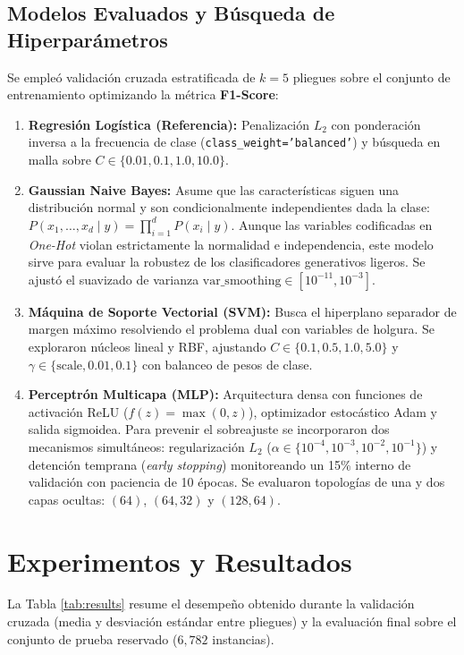 \documentclass[conference]{IEEEtran}
\begin{document}
\subsection{Modelos Evaluados y Búsqueda de Hiperparámetros}
Se empleó validación cruzada estratificada de $k=5$ pliegues sobre el conjunto de entrenamiento optimizando la métrica \textbf{F1-Score}:
\begin{enumerate}
    \item \textbf{Regresión Logística (Referencia):} Penalización $L_2$ con ponderación inversa a la frecuencia de clase (\texttt{class\_weight='balanced'}) y búsqueda en malla sobre $C \in \{0.01, 0.1, 1.0, 10.0\}$.
    \item \textbf{Gaussian Naive Bayes:} Asume que las características siguen una distribución normal y son condicionalmente independientes dada la clase: $P(x_1,\dots,x_d \mid y) = \prod_{i=1}^d P(x_i \mid y)$. Aunque las variables codificadas en \textit{One-Hot} violan estrictamente la normalidad e independencia, este modelo sirve para evaluar la robustez de los clasificadores generativos ligeros. Se ajustó el suavizado de varianza $\text{var\_smoothing} \in [10^{-11}, 10^{-3}]$.
    \item \textbf{Máquina de Soporte Vectorial (SVM):} Busca el hiperplano separador de margen máximo resolviendo el problema dual con variables de holgura. Se exploraron núcleos lineal y RBF, ajustando $C \in \{0.1, 0.5, 1.0, 5.0\}$ y $\gamma \in \{\text{scale}, 0.01, 0.1\}$ con balanceo de pesos de clase.
    \item \textbf{Perceptrón Multicapa (MLP):} Arquitectura densa con funciones de activación ReLU ($f(z) = \max(0, z)$), optimizador estocástico Adam y salida sigmoidea. Para prevenir el sobreajuste se incorporaron dos mecanismos simultáneos: regularización $L_2$ ($\alpha \in \{10^{-4}, 10^{-3}, 10^{-2}, 10^{-1}\}$) y detención temprana (\textit{early stopping}) monitoreando un 15\% interno de validación con paciencia de 10 épocas. Se evaluaron topologías de una y dos capas ocultas: $(64)$, $(64, 32)$ y $(128, 64)$.
\end{enumerate}

\section{Experimentos y Resultados}
La Tabla \ref{tab:results} resume el desempeño obtenido durante la validación cruzada (media y desviación estándar entre pliegues) y la evaluación final sobre el conjunto de prueba reservado ($6,782$ instancias).
\end{document}
